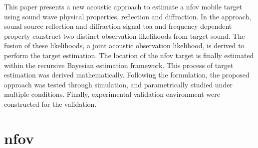 \documentclass[letterpaper, 10 pt, conference]{ieeeconf}  %
\begin{document}
This paper presents a new acoustic approach to estimate a \gls{nfov} mobile target using sound wave physical properties, reflection and diffraction. In the approach, sound source reflection and diffraction signal \gls{toa} and frequency dependent property construct two distinct observation likelihoods from target sound. The fusion of these likelihoods, a joint acoustic observation likelihood, is derived to perform the target estimation. The location of the \gls{nfov} target is finally estimated within the recursive Bayesian estimation framework. This process of target estimation was derived mathematically. Following the formulation, the proposed approach was tested through simulation, and parametrically studied under multiple conditions. Finally, experimental validation environment were constructed for the validation.

\section{\gls{nfov}}
\end{document}
